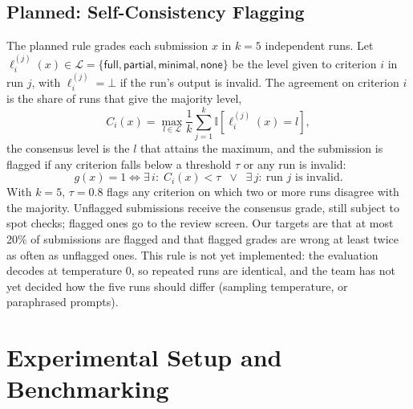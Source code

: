 \documentclass[11pt,a4paper]{article}
\newif\ifdraft
\newcommand{\todo}[2]{%
  \ifdraft\textcolor{red}{\textbf{[TODO #1:} #2\textbf{]}}\fi}
\newcommand{\file}[1]{\nolinkurl{#1}}
\newcommand{\lvl}[1]{\textsf{#1}}
\newcommand{\indic}{\mathbb{I}}
\newcommand{\levels}{\mathcal{L}}
\theoremstyle{definition}
\begin{document}
\subsection{Planned: Self-Consistency Flagging}\label{sec:sc}
The planned rule grades each submission $x$ in $k=5$ independent runs. Let $\ell_i^{(j)}(x)\in\levels=\{\lvl{full},\lvl{partial},\lvl{minimal},\lvl{none}\}$ be the level given to criterion $i$ in run $j$, with $\ell_i^{(j)}=\bot$ if the run's output is invalid. The agreement on criterion $i$ is the share of runs that give the majority level,
\begin{equation}\label{eq:agree}
  C_i(x)=\max_{l\in\levels}\frac{1}{k}\sum_{j=1}^{k}\indic\!\left[\ell_i^{(j)}(x)=l\right],
\end{equation}
the consensus level is the $l$ that attains the maximum, and the submission is flagged if any criterion falls below a threshold $\tau$ or any run is invalid:
\begin{equation}\label{eq:flag}
  g(x)=1 \iff \exists\, i:\; C_i(x)<\tau \;\;\lor\;\; \exists\, j:\ \text{run } j \text{ is invalid}.
\end{equation}
With $k=5$, $\tau=0.8$ flags any criterion on which two or more runs disagree with the majority. Unflagged submissions receive the consensus grade, still subject to spot checks; flagged ones go to the review screen. Our targets are that at most 20\% of submissions are flagged and that flagged grades are wrong at least twice as often as unflagged ones.
This rule is not yet implemented: the evaluation decodes at temperature 0, so repeated runs are identical, and the team has not yet decided how the five runs should differ (sampling temperature, or paraphrased prompts).
\todo{}{Decide how the five runs differ, implement it in \file{eval/metrics.py} and the worker, and fill \cref{tab:rq_triage}; otherwise move this subsection to future work.}

\section{Experimental Setup and Benchmarking}\label{sec:setup}
\end{document}
